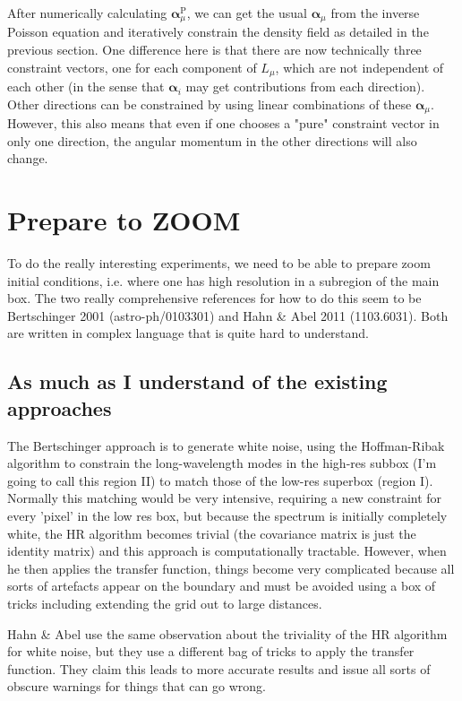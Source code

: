 \documentclass[11pt,a4paper,preprint]{aastex}
\newcommand{\bmath}[1]{\ensuremath{\bm{#1}}}
\renewcommand{\vec}[1]{\bmath{#1}}
\begin{document}
After numerically calculating $\vec{\alpha}_{\mu}^{\mathrm{P}}$, we can get the usual $\vec{\alpha}_{\mu}$ from the inverse Poisson equation and iteratively constrain the density field as detailed in the previous section.
One difference here is that there are now technically three constraint
vectors, one for each component of $L_{\mu}$, which are not
independent of each other (in the sense that $\vec{\alpha}_i$ may get
contributions from each direction). Other directions can be
constrained by using linear combinations of these
$\vec{\alpha}_{\mu}$. However, this also means that even if one
chooses a "pure" constraint vector in only one direction, the angular
momentum in the other directions will also change.


\section{Prepare to ZOOM}

To do the really interesting experiments, we need to be able to
prepare zoom initial conditions, i.e. where one has high resolution in
a subregion of the main box. The two really comprehensive references
for how to do this seem to be Bertschinger 2001 (astro-ph/0103301) and
Hahn \& Abel 2011 (1103.6031). Both are written in complex language
that is quite hard to understand.

\subsection{As much as I understand of the existing approaches}

The Bertschinger approach is to generate white noise, using the
Hoffman-Ribak algorithm to constrain the long-wavelength modes in the
high-res subbox (I'm going to call this region II) to match those of
the low-res superbox (region I). Normally this matching would be very
intensive, requiring a new constraint for every 'pixel' in the low res
box, but because the spectrum is initially completely white, the HR
algorithm becomes trivial (the covariance matrix is just the identity
matrix) and this approach is computationally tractable. However, when
he then applies the transfer function, things become very complicated
because all sorts of artefacts appear on the boundary and must be
avoided using a box of tricks including extending the grid out to
large distances.

Hahn \& Abel use the same observation about the triviality of the HR
algorithm for white noise, but they use a different bag of tricks to
apply the transfer function. They claim this leads to more accurate
results and issue all sorts of obscure warnings for things that can go
wrong.
\end{document}
